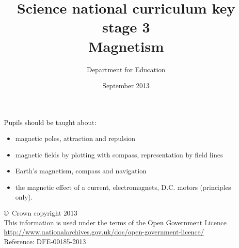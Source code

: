 \documentclass[a4paper,12pt]{article}
\begin{document}
\setcounter{secnumdepth}{0}

\title{Science national curriculum key stage 3\\Magnetism}
\author{Department for Education}
\date{September 2013}
\maketitle

\thispagestyle{empty}

Pupils should be taught about:

\begin{itemize}
\item magnetic poles, attraction and repulsion
\item magnetic fields by plotting with compass, representation by field lines
\item Earth's magnetism, compass and navigation
\item the magnetic effect of a current, electromagnets, D.C. motors (principles only).
\end{itemize}

\vfill

\footnotesize
\noindent \copyright\ Crown copyright 2013\\
This information is used under the terms of the Open Government Licence\\
\url{http://www.nationalarchives.gov.uk/doc/open-government-licence/}\\
{\tiny Reference: DFE-00185-2013}
\end{document}
